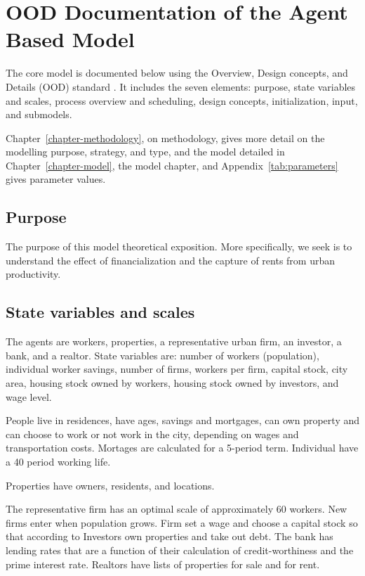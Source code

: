 \chapter{OOD Documentation of the Agent Based Model} \label{appendix-odd}
The core model is documented below using the Overview, Design concepts, and Details (OOD) standard \cite{grimmODDProtocolDescribing2020, grimmODDProtocolReview2010a}. It includes the seven elements: purpose, state variables and scales, process overview and scheduling, design concepts, initialization, input, and submodels. 

Chapter~\ref{chapter-methodology}, on methodology, gives more detail on the modelling purpose, strategy, and type, and the model detailed in Chapter~\ref{chapter-model}, the model chapter, and Appendix~\ref{tab:parameters} gives parameter values.


\section{Purpose}
The purpose of this model \gls{theoretical exposition}. More specifically, we seek is to understand the effect of financialization and the capture of rents from urban productivity. %



\section{State variables and scales}
The agents are workers,  %
properties, a representative urban firm, an investor, a bank, and a realtor. 
State variables are: number of workers (population), individual worker savings, number of firms, workers per firm, capital stock, city area, housing stock owned by workers, housing stock owned by investors, and wage level.

People live in residences, have ages, savings and mortgages, can own property and can choose to work or not work in the city, depending on wages and transportation costs. Mortages are calculated for a 5-period term. Individual have a 40 period working life.

Properties have owners, residents, and locations. 

The representative firm has an optimal scale of approximately 60 workers. New firms enter when population grows. Firm set a wage and choose a capital stock so that according to   
Investors own properties and take out debt. The bank has lending rates that are a function of their calculation of credit-worthiness and the prime interest rate. Realtors have lists of properties for sale and for rent. 

